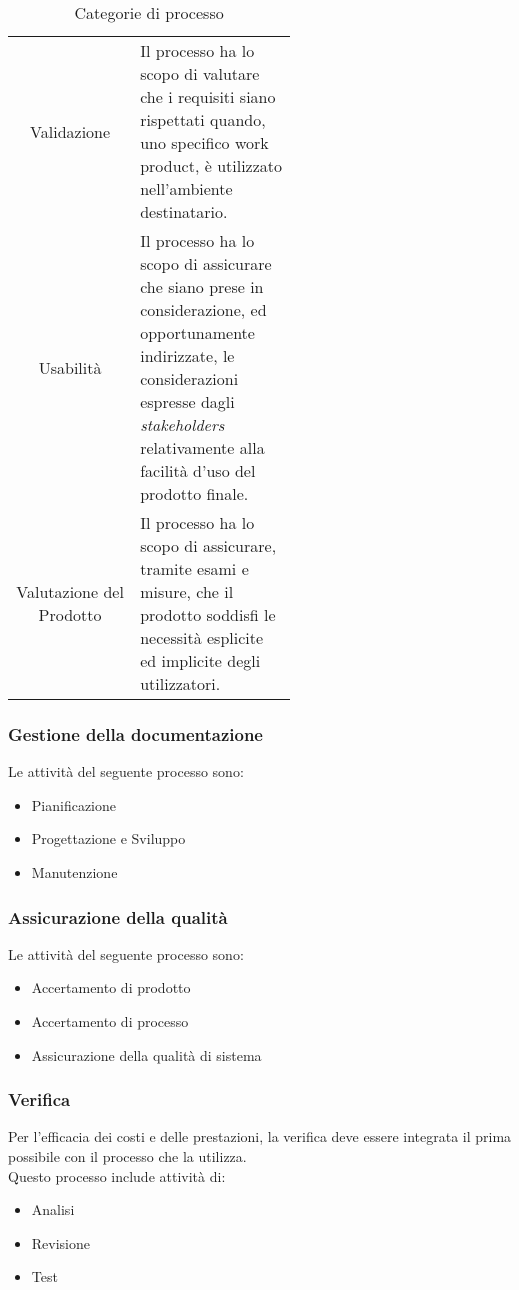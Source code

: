 \begin{table}[h!]
\begin{tabular}{c|p{0.56\linewidth}}
        \rowcolor[RGB]{233, 245, 206}
        Validazione
        & Il processo ha lo scopo di valutare che i requisiti siano rispettati quando,
        uno specifico work product, è utilizzato nell'ambiente destinatario. \\[4pt]
        \rowcolor[RGB]{216, 235, 171}
        Usabilità
        & Il processo ha lo scopo di assicurare che siano prese in considerazione, ed  opportunamente indirizzate, 
        le considerazioni espresse dagli \textit{stakeholders} relativamente alla facilità d'uso del prodotto finale. \\[4pt]
        \rowcolor[RGB]{233, 245, 206}
        Valutazione del Prodotto
        & Il processo ha lo scopo di assicurare, tramite esami e misure, che il prodotto soddisfi le necessità esplicite 
        ed implicite degli utilizzatori.  \\[4pt]
    \end{tabular}
    \caption{Categorie di processo}
\end{table}

\subsubsection{Gestione della documentazione}
Le attività del seguente processo sono:
\begin{itemize}
    \item Pianificazione
    \item Progettazione e Sviluppo
    \item Manutenzione
\end{itemize}

\subsubsection{Assicurazione della qualità}
Le attività del seguente processo sono:
\begin{itemize}
    \item Accertamento di prodotto
    \item Accertamento di processo
    \item Assicurazione della qualità di sistema
\end{itemize}

\subsubsection{Verifica}
Per l'efficacia dei costi e delle prestazioni, la verifica deve essere integrata il prima possibile con il processo 
che la utilizza.\\ 
Questo processo include attività di:
\begin{itemize}
    \item Analisi
    \item Revisione
    \item Test
\end{itemize}

\setlength\extrarowheight{0pt}

